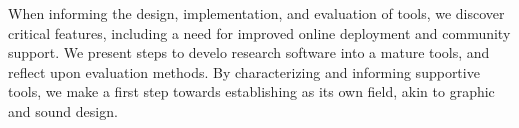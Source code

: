 When informing the design, implementation, and evaluation of \haxd tools,
we discover critical features, including a need for improved online deployment and community support.
We present steps to develo %
 research software into a mature  %
tools, and reflect upon evaluation methods.
%
By characterizing \haxd and informing supportive tools, we make a first step towards establishing \haxd as its own field, akin to graphic and sound design.


